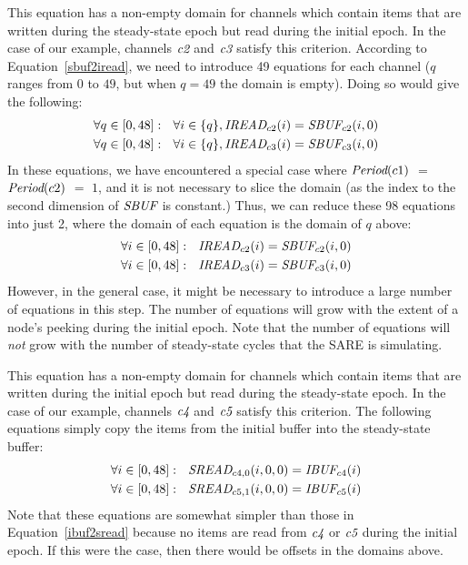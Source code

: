This equation has a non-empty domain for channels which contain items
that are written during the steady-state epoch but read during the
initial epoch.  In the case of our example, channels $\mbox{\it c2}$ and
$\mbox{\it c3}$ satisfy this criterion.  According to
Equation~\ref{sbuf2iread}, we need to introduce 49 equations for
each channel ($q$ ranges from $0$ to $49$, but when $q = 49$ the
domain is empty).  Doing so would give the following:
\begin{align*}
\forall q \in [0, 48]:~~\forall i \in \{q\}, \mbox{\it IREAD}_{c2}(i) &= \mbox{\it SBUF}_{c2}(i, 0) \\
\forall q \in [0, 48]:~~\forall i \in \{q\}, \mbox{\it IREAD}_{c3}(i) &= \mbox{\it SBUF}_{c3}(i, 0)
\end{align*}
In these equations, we have encountered a special case where
$\mbox{\it Period}(c1)$ $=$ $\mbox{\it Period}(c2)$ $=$ $1$, and it is not
necessary to slice the domain (as the index to the second dimension of
$\mbox{\it SBUF}$ is constant.)  Thus, we can reduce these 98 equations into
just 2, where the domain of each equation is the domain of $q$ above:
\begin{align*}
\forall i \in [0, 48]:~~\mbox{\it IREAD}_{c2}(i) &= \mbox{\it SBUF}_{c2}(i, 0) \\
\forall i \in [0, 48]:~~\mbox{\it IREAD}_{c3}(i) &= \mbox{\it SBUF}_{c3}(i, 0)
\end{align*}
However, in the general case, it might be necessary to introduce a
large number of equations in this step.  The number of equations will
grow with the extent of a node's peeking during the initial epoch.
Note that the number of equations will {\it not} grow with the number
of steady-state cycles that the SARE is simulating.


This equation has a non-empty domain for channels which contain items
that are written during the initial epoch but read during the
steady-state epoch.  In the case of our example, channels $\mbox{\it c4}$
and $\mbox{\it c5}$ satisfy this criterion.  The following equations
simply copy the items from the initial buffer into the steady-state
buffer:
\begin{align*}
\forall i \in [0, 48]:~~\mbox{\it SREAD}_{{c4}, 0}(i,0,0) &= \mbox{\it IBUF}_{c4}(i) \\
\forall i \in [0, 48]:~~\mbox{\it SREAD}_{{c5}, 1}(i,0,0) &= \mbox{\it IBUF}_{c5}(i) 
\end{align*}
Note that these equations are somewhat simpler than those in
Equation~\ref{ibuf2sread} because no items are read from
$\mbox{\it c4}$ or $\mbox{\it c5}$ during the initial epoch.  If this were the
case, then there would be offsets in the domains above.

